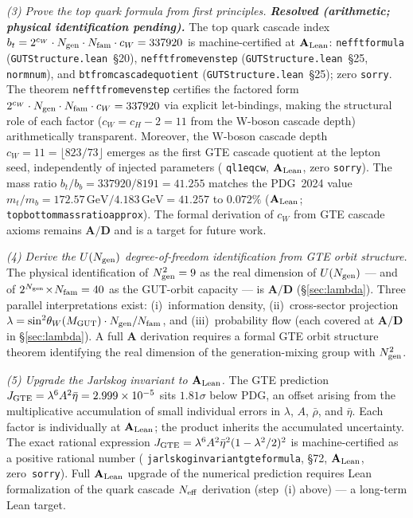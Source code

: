 \documentclass[11pt]{article}
\theoremstyle{remark}
\newcommand{\Ngen}{N_{\rm gen}}
\newcommand{\Nfam}{N_{\rm fam}}
\newcommand{\lean}[1]{%
  \penalty-100
  \begingroup\def\_{\textunderscore\allowbreak}\texttt{#1}\endgroup}
\newcommand{\lam}{\lambda}
\newcommand{\Rbar}{\bar{\rho}}
\newcommand{\Ebar}{\bar{\eta}}
\newcommand{\bb}{b_b}
\newcommand{\bt}{b_t}
\newcommand{\sinwsq}{\sin^2\!\theta_W}
\newcommand{\CatA}{\textbf{A}}
\newcommand{\CatAL}{\ensuremath{\textbf{A}_{\rm Lean}}}
\newcommand{\CatAD}{\textbf{A/D}}
\begin{document}
\smallskip
\noindent\textit{(3) Prove the top quark formula from first principles.
\textbf{Resolved (arithmetic; physical identification pending).}}
The top quark cascade index $\bt = 2^{c_W}\cdot\Ngen\cdot\Nfam\cdot c_W = 337920$
is machine-certified at $\CatAL$:
\lean{neff\_t\_formula} (\texttt{GUTStructure.lean}~\S20),
\lean{neff\_t\_from\_even\_step} (\texttt{GUTStructure.lean}~\S25, \lean{norm\_num}), and
\lean{bt\_from\_cascade\_quotient} (\texttt{GUTStructure.lean}~\S25);
zero \texttt{sorry}.
The theorem \lean{neff\_t\_from\_even\_step} certifies the factored form
$2^{c_W}\cdot\Ngen\cdot\Nfam\cdot c_W = 337920$ via explicit let-bindings,
making the structural role of each factor ($c_W = c_H - 2 = 11$ from the
W-boson cascade depth) arithmetically transparent.
Moreover, the W-boson cascade depth $c_W = 11 = \lfloor 823/73\rfloor$ emerges as the
first GTE cascade quotient at the lepton seed, independently of injected parameters
(\lean{q\_l1\_eq\_c\_w}, $\CatAL$, zero \texttt{sorry}).
The mass ratio $\bt/\bb = 337920/8191 = 41.255$ matches the PDG~2024 value
$m_t/m_b = 172.57\,\mathrm{GeV}/4.183\,\mathrm{GeV} = 41.257$ to $0.072\%$
($\CatAL$; \lean{top\_bottom\_mass\_ratio\_approx}).
The formal derivation of $c_W$ from GTE cascade axioms remains $\CatAD$ and is a target
for future work.

\smallskip
\noindent\textit{(4) Derive the $U(N_{\rm gen})$ degree-of-freedom identification from GTE orbit structure.}
The physical identification of $\Ngen^2 = 9$ as the real dimension of $U(N_{\rm gen})$
--- and of $2^{\Ngen}\!\times\!\Nfam = 40$ as the GUT-orbit capacity --- is $\CatAD$
(\S\ref{sec:lambda}).
Three parallel interpretations exist: (i)~information density, (ii)~cross-sector
projection $\lam = \sinwsq(M_{\rm GUT})\cdot\Ngen/\Nfam$, and
(iii)~probability flow (each covered at $\CatAD$ in \S\ref{sec:lambda}).
A full $\CatA$ derivation requires a formal GTE orbit structure theorem identifying
the real dimension of the generation-mixing group with $\Ngen^2$.

\smallskip
\noindent\textit{(5) Upgrade the Jarlskog invariant to $\CatAL$.}
The GTE prediction $J_{\rm GTE} = \lam^6 A^2 \Ebar = 2.999\times 10^{-5}$
sits $1.81\sigma$ below PDG, an offset arising from the multiplicative accumulation
of small individual errors in $\lambda$, $A$, $\Rbar$, and $\Ebar$.
Each factor is individually at $\CatAL$; the product inherits the accumulated
uncertainty.
The exact rational expression $J_{\rm GTE} = \lambda^6 A^2 \bar\eta^2(1-\lambda^2/2)^2$
is machine-certified as a positive rational number
(\lean{jarlskog\_invariant\_gte\_formula}, \S72, $\CatAL$, zero~\texttt{sorry}).
Full $\CatAL$ upgrade of the numerical prediction requires Lean formalization of
the quark cascade $N_{\rm eff}$ derivation (step~(i) above) — a long-term Lean target.
\end{document}
